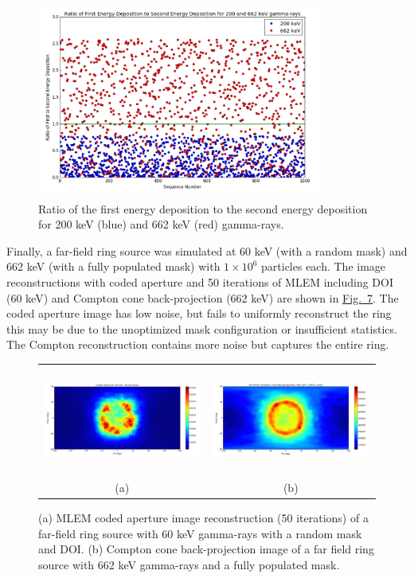 \documentclass[10pt]{article}
\begin{document}
\begin{figure}[htb!]
\hypertarget{fig6}{}
\centering
\includegraphics[height=180pt]{Figures/EnergyDepTest.png} 
\caption{Ratio of the first energy deposition to the second energy deposition for 200 keV (blue) and 662 keV (red) gamma-rays.}
\end{figure}

Finally, a far-field ring source was simulated at 60 keV (with a random mask) and 662 keV (with a fully populated mask) with $1\times10^6$ particles each. The image reconstructions with coded aperture and 50 iterations of MLEM including DOI (60 keV) and Compton cone back-projection (662 keV) are shown in \hyperlink{fig7}{Fig.~7}. The coded aperture image has low noise, but fails to uniformly reconstruct the ring this may be due to the unoptimized mask configuration or insufficient statistics. The Compton reconstruction contains more noise but captures the entire ring.

\begin{figure}[htb!]
\hypertarget{fig7}{}
\centering
\begin{tabular}{cc}
	\includegraphics[height=100pt]{Figures/FarfieldRing_60_DOI.png} & 
	\includegraphics[height=100pt]{Figures/FarfieldRing_662.png} \\ [-0.5ex]
	\scriptsize{(a)} & \scriptsize{(b)}
\end{tabular}
\caption{(a) MLEM coded aperture image reconstruction (50 iterations) of a far-field ring source with 60 keV gamma-rays with a random mask and DOI. (b) Compton cone back-projection image of a far field ring source with 662 keV gamma-rays and a fully populated mask.}
\end{figure}
\end{document}
